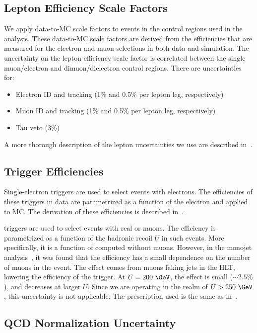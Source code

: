 \subsection{Lepton Efficiency Scale Factors}\label{sec:lep}
We apply data-to-MC scale factors to events in the control regions used in the analysis. These data-to-MC scale factors are derived from the efficiencies that are measured for the electron and muon selections in both data and simulation. The uncertainty on the lepton efficiency scale factor is correlated between the single muon/electron and dimuon/dielectron control regions. There are uncertainties for:
\begin{itemize}
  \item Electron ID and tracking (1\% and 0.5\% per lepton leg, respectively)
  \item Muon ID and tracking (1\% and 0.5\% per lepton leg, respectively)
  \item Tau veto (3\%)
\end{itemize}
A more thorough description of the lepton uncertainties we use are described in~\cite{CMS_AN_2016-473}.

\subsection{Trigger Efficiencies}\label{sec:trigeff}
Single-electron triggers are used to select events with electrons.
The efficiencies of these triggers in data are parametrized as a function of the electron \pt and applied to MC.
The derivation of these efficiencies is described in~\cite{CMS_AN_2016-473}.

\ETmiss triggers are used to select events with real \ETmiss or muons.
The efficiency is parametrized as a function of the hadronic recoil $U$ in such events.
More specifically, it is a function of \ETmiss computed without muons.
However, in the monojet analysis~\cite{CMS_AN_2016-473}, it was found that the efficiency has a small dependence on the number of muons in the event.
The effect comes from muons faking jets in the HLT, lowering the efficiency of the trigger.
At $U=200~\GeV$, the effect is small ($\sim2.5\%$), and decreases at larger $U$. Since we are operating in the realm of $U > 250~\GeV$, this uncertainty is not applicable.
The prescription used is the same as in~\cite{CMS_AN_2016-473}.

\subsection{QCD Normalization Uncertainty}

